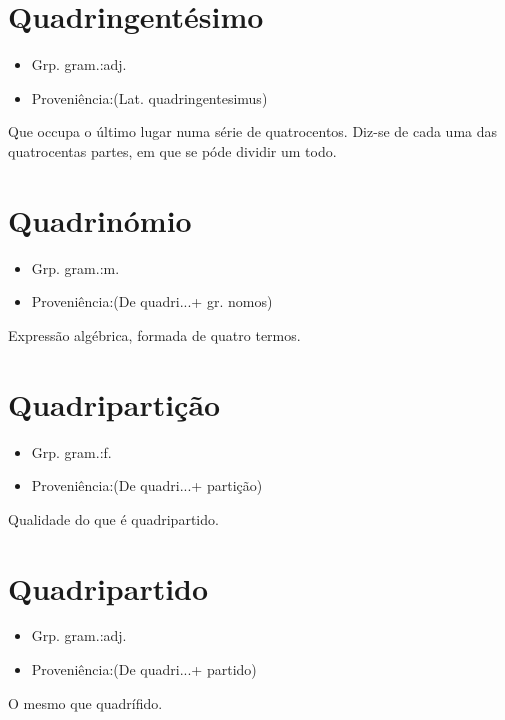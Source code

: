\section{Quadringentésimo}
\begin{itemize}
\item {Grp. gram.:adj.}
\end{itemize}
\begin{itemize}
\item {Proveniência:(Lat. \textunderscore quadringentesimus\textunderscore )}
\end{itemize}
Que occupa o último lugar numa série de quatrocentos.
Diz-se de cada uma das quatrocentas partes, em que se póde dividir um todo.
\section{Quadrinómio}
\begin{itemize}
\item {Grp. gram.:m.}
\end{itemize}
\begin{itemize}
\item {Proveniência:(De \textunderscore quadri...\textunderscore  + gr. \textunderscore nomos\textunderscore )}
\end{itemize}
Expressão algébrica, formada de quatro termos.
\section{Quadripartição}
\begin{itemize}
\item {Grp. gram.:f.}
\end{itemize}
\begin{itemize}
\item {Proveniência:(De \textunderscore quadri...\textunderscore  + \textunderscore partição\textunderscore )}
\end{itemize}
Qualidade do que é quadripartido.
\section{Quadripartido}
\begin{itemize}
\item {Grp. gram.:adj.}
\end{itemize}
\begin{itemize}
\item {Proveniência:(De \textunderscore quadri...\textunderscore  + \textunderscore partido\textunderscore )}
\end{itemize}
O mesmo que \textunderscore quadrífido\textunderscore .
